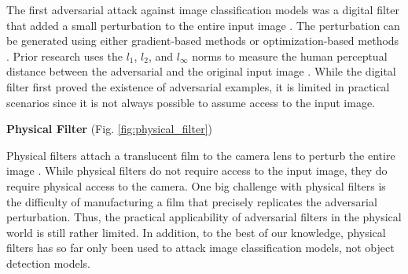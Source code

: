The first adversarial attack against image classification models was a digital filter that added a small perturbation to the entire input image \citep{goodfellow2014explaining}. The perturbation can be generated using either gradient-based methods \citep{madryMSTV18} \citep{kurakin2018adversarial} \citep{wong2019wasserstein} \citep{croce2020reliable} or optimization-based methods \citep{papernot2016transferability} \citep{carlini2017towards} \citep{qin2019imperceptible}. Prior research uses the $l_1$, $l_2$, and $l_{\infty}$ norms to measure the human perceptual distance between the adversarial and the original input image \citep{miyato2015distributional} \citep{sabour2015adversarial} \citep{chen2018ead}. While the digital filter first proved the existence of adversarial examples, it is limited in practical scenarios since it is not always possible to assume access to the input image.

\textbf{Physical Filter} (Fig. \ref{fig:physical_filter})

Physical filters attach a translucent film to the camera lens to perturb the entire image \citep{li2019adversarial}. While physical filters do not require access to the input image, they do require physical access to the camera. One big challenge with physical filters is the difficulty of manufacturing a film that precisely replicates the adversarial perturbation. Thus, the practical applicability of adversarial filters in the physical world is still rather limited. In addition, to the best of our knowledge, physical filters has so far only been used to attack image classification models, not object detection models. 


